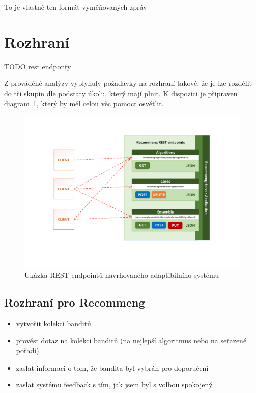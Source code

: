 \documentclass[thesis=M,czech]{FITthesis}[2014/05/07]
\begin{document}
To je vlastně ten formát vyměňovaných zpráv

\section{Rozhraní}

TODO rest endponty

Z prováděné analýzy vyplynuly požadavky na rozhraní takové, že je lze rozdělit do tří skupin dle podstaty úkolu, který mají plnit. K dispozici je připraven diagram~\ref{fig:rest}, který by měl celou věc pomoct osvětlit. 

\begin{figure}\centering
	\includegraphics[width=1.0\textwidth]{obr/DIPLOMKA_rest.pdf}
 	\caption[Ukázka REST endpointů navrhovaného adaptibilního systému]{Ukázka REST endpointů navrhovaného adaptibilního systému}\label{fig:rest}
\end{figure}	

\subsection{Rozhraní pro Recommeng}

\begin{itemize}
	\item vytvořit kolekci banditů
	\item 	provést dotaz na kolekci banditů (na nejlepší algoritmus nebo na seřazené pořadí)
	\item 	zaslat informaci o tom, že bandita byl vybrán pro doporučení
	\item zaslat systému feedback s tím, jak jsem byl s volbou spokojený		
\end{itemize}
\end{document}
